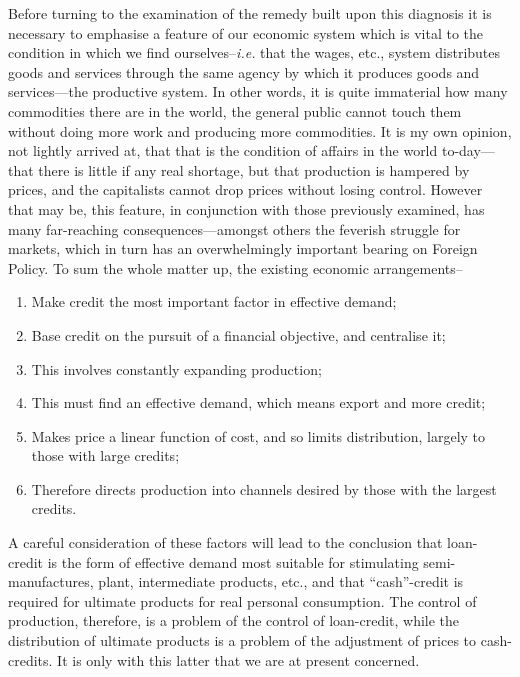 \documentclass{book}
\begin{document}
Before turning to the examination of the remedy built upon this diagnosis it is necessary to emphasise a feature of our economic system which is vital to the condition in which we find ourselves–\emph{i.e.} that the wages, etc., system distributes goods and services through the same agency by which it produces goods and services—the productive system. In other words, it is quite immaterial how many commodities there are in the world, the general public cannot touch them without doing more work and producing more commodities. It is my own opinion, not lightly arrived at, that that is the condition of affairs in the world to-day—that there is little if any real shortage, but that production is hampered by prices, and the capitalists cannot drop prices without losing control. However that may be, this feature, in conjunction with those previously examined, has many far-reaching consequences—amongst others the feverish struggle for markets, which in turn has an overwhelmingly important bearing on Foreign Policy. To sum the whole matter up, the existing economic arrangements–

\begin{enumerate}
	\item Make credit the most important factor in effective demand;


	\item Base credit on the pursuit of a financial objective, and centralise it;


	\item This involves constantly expanding production;


	\item This must find an effective demand, which means export and more credit;


	\item Makes price a linear function of cost, and so limits distribution, largely to those with large credits;


	\item Therefore directs production into channels desired by those with the largest credits.



\end{enumerate}
A careful consideration of these factors will lead to the conclusion that loan-credit is the form of effective demand most suitable for stimulating semi-manufactures, plant, intermediate products, etc., and that “cash”-credit is required for ultimate products for real personal consumption. The control of production, therefore, is a problem of the control of loan-credit, while the distribution of ultimate products is a problem of the adjustment of prices to cash-credits. It is only with this latter that we are at present concerned.
\end{document}
